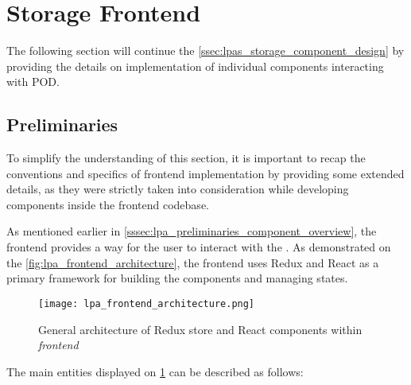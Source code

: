 \section{Storage Frontend}
\label{sssec:lpas_storage_frontend_implementation}

The following section will continue the \autoref{ssec:lpas_storage_component_design} by providing the details on implementation of individual components interacting with \solid{} POD. 

\subsection{Preliminaries}
\label{sssec:preliminaries_storage_frontend}

To simplify the understanding of this section, it is important to recap the conventions and specifics of \lpa{} frontend implementation by providing some extended details, as they were strictly taken into consideration while developing \lpas{} components inside the \lpa{} frontend codebase.

As mentioned earlier in \autoref{sssec:lpa_preliminaries_component_overview}, the frontend provides a way for the user to interact with the \lpa{}. As demonstrated on the \autoref{fig:lpa_frontend_architecture}, the frontend uses Redux and React as a primary framework for building the components and managing states.

\begin{figure}[h]
\centering
\texttt{[image: lpa\_frontend\_architecture.png]}
\caption{General architecture of Redux store and React components within \emph{frontend}}
\label{fig:lpa_frontend_architecture}
\end{figure}

The main entities displayed on \ref{fig:lpa_frontend_architecture} can be described as follows:

